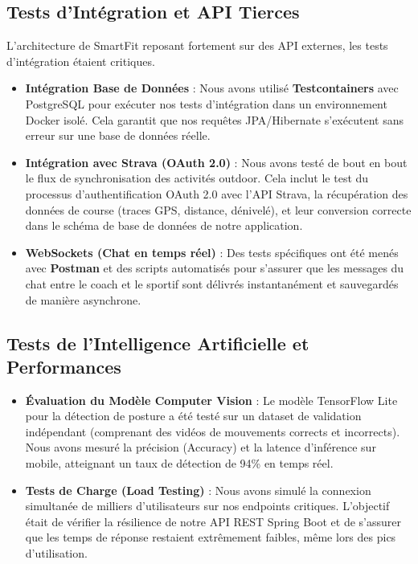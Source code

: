 \subsection{Tests d'Intégration et API Tierces}
L'architecture de SmartFit reposant fortement sur des API externes, les tests d'intégration étaient critiques.
\begin{itemize}
    \item \textbf{Intégration Base de Données} : Nous avons utilisé \textbf{Testcontainers} avec PostgreSQL pour exécuter nos tests d'intégration dans un environnement Docker isolé. Cela garantit que nos requêtes JPA/Hibernate s'exécutent sans erreur sur une base de données réelle.
    \item \textbf{Intégration avec Strava (OAuth 2.0)} : Nous avons testé de bout en bout le flux de synchronisation des activités outdoor. Cela inclut le test du processus d'authentification OAuth 2.0 avec l'API Strava, la récupération des données de course (traces GPS, distance, dénivelé), et leur conversion correcte dans le schéma de base de données de notre application.
    \item \textbf{WebSockets (Chat en temps réel)} : Des tests spécifiques ont été menés avec \textbf{Postman} et des scripts automatisés pour s'assurer que les messages du chat entre le coach et le sportif sont délivrés instantanément et sauvegardés de manière asynchrone.
\end{itemize}

\subsection{Tests de l'Intelligence Artificielle et Performances}
\begin{itemize}
    \item \textbf{Évaluation du Modèle Computer Vision} : Le modèle TensorFlow Lite pour la détection de posture a été testé sur un dataset de validation indépendant (comprenant des vidéos de mouvements corrects et incorrects). Nous avons mesuré la précision (Accuracy) et la latence d'inférence sur mobile, atteignant un taux de détection de 94\% en temps réel.
    \item \textbf{Tests de Charge (Load Testing)} : Nous avons simulé la connexion simultanée de milliers d'utilisateurs sur nos endpoints critiques. L'objectif était de vérifier la résilience de notre API REST Spring Boot et de s'assurer que les temps de réponse restaient extrêmement faibles, même lors des pics d'utilisation.
\end{itemize}

